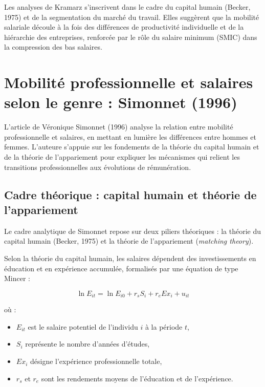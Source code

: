 \documentclass[12pt,a4paper]{article}
\begin{document}
Les analyses de Kramarz s’inscrivent dans le cadre du capital humain (Becker, 1975) et de la segmentation du marché du travail. 
Elles suggèrent que la mobilité salariale découle à la fois des différences de productivité individuelle et de la hiérarchie des entreprises, renforcée par le rôle du salaire minimum (SMIC) dans la compression des bas salaires.

\newpage

\section{Mobilité professionnelle et salaires selon le genre : Simonnet (1996)}

L’article de Véronique Simonnet (1996) analyse la relation entre mobilité professionnelle et salaires, en mettant en lumière les différences entre hommes et femmes. 
L’auteure s’appuie sur les fondements de la théorie du capital humain et de la théorie de l’appariement pour expliquer les mécanismes qui relient les transitions professionnelles aux évolutions de rémunération.

\subsection{Cadre théorique : capital humain et théorie de l’appariement}

Le cadre analytique de Simonnet repose sur deux piliers théoriques :  
la théorie du capital humain (Becker, 1975) et la théorie de l’appariement (\textit{matching theory}).  

Selon la théorie du capital humain, les salaires dépendent des investissements en éducation et en expérience accumulée, formalisés par une équation de type Mincer :

\begin{equation}
\ln E_{it} = \ln E_{i0} + r_s S_i + r_e Ex_i + u_{it}
\end{equation}

où :
\begin{itemize}
    \item $E_{it}$ est le salaire potentiel de l’individu $i$ à la période $t$,
    \item $S_i$ représente le nombre d’années d’études,
    \item $Ex_i$ désigne l’expérience professionnelle totale,
    \item $r_s$ et $r_e$ sont les rendements moyens de l’éducation et de l’expérience.
\end{itemize}
\end{document}
